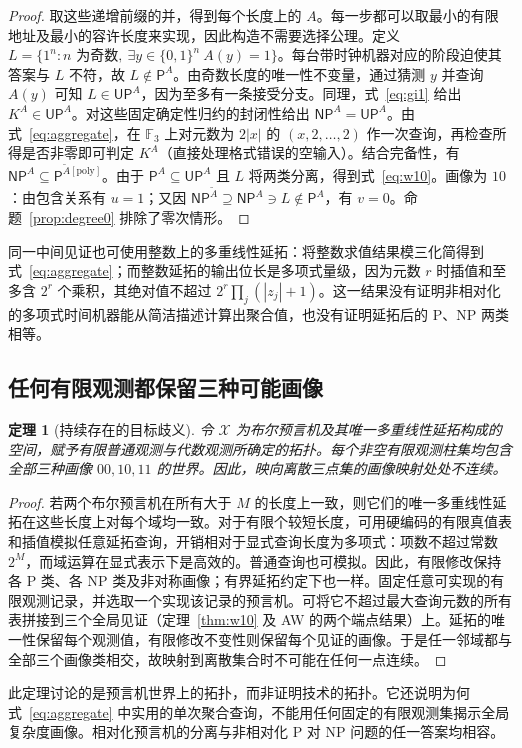 \documentclass[11pt,a4paper]{article}
\newcommand{\bits}{\{0,1\}}
\newcommand{\PP}{\mathsf{P}}
\newcommand{\NP}{\mathsf{NP}}
\newcommand{\UP}{\mathsf{UP}}
\newcommand{\Atil}{\widetilde A}
\newcommand{\F}{\mathbb F}
\newtheorem{theorem}{定理}[section]
\begin{document}
\begin{proof}
取这些递增前缀的并，得到每个长度上的 $A$。每一步都可以取最小的有限地址及最小的容许长度来实现，因此构造不需要选择公理。定义 $L=\{1^n:n\text{ 为奇数},\ \exists y\in\bits^n\ A(y)=1\}$。每台带时钟机器对应的阶段迫使其答案与 $L$ 不符，故 $L\notin\PP^A$。由奇数长度的唯一性不变量，通过猜测 $y$ 并查询 $A(y)$ 可知 $L\in\UP^A$，因为至多有一条接受分支。同理，式~\eqref{eq:gi1} 给出 $K^A\in\UP^A$。对这些固定确定性归约的封闭性给出 $\NP^A=\UP^A$。由式~\eqref{eq:aggregate}，在 $\F_3$ 上对元数为 $2|x|$ 的 $(x,2,\ldots,2)$ 作一次查询，再检查所得是否非零即可判定 $K^A$（直接处理格式错误的空输入）。结合完备性，有 $\NP^A\subseteq\PP^{\Atil[\mathrm{poly}]}$。由于 $\PP^A\subseteq\UP^A$ 且 $L$ 将两类分离，得到式~\eqref{eq:w10}。画像为 $10$：由包含关系有 $u=1$；又因 $\NP^{\Atil}\supseteq\NP^A\ni L\notin\PP^A$，有 $v=0$。命题~\ref{prop:degree0} 排除了零次情形。
\end{proof}
同一中间见证也可使用整数上的多重线性延拓：将整数求值结果模三化简得到式~\eqref{eq:aggregate}；而整数延拓的输出位长是多项式量级，因为元数 $r$ 时插值和至多含 $2^r$ 个乘积，其绝对值不超过 $2^r\prod_j(|z_j|+1)$。这一结果没有证明非相对化的多项式时间机器能从简洁描述计算出聚合值，也没有证明延拓后的 P、NP 两类相等。

\subsection{任何有限观测都保留三种可能画像}
\begin{theorem}[持续存在的目标歧义]\label{thm:top}
令 $\mathcal X$ 为布尔预言机及其唯一多重线性延拓构成的空间，赋予有限普通观测与代数观测所确定的拓扑。每个非空有限观测柱集均包含全部三种画像 $00,10,11$ 的世界。因此，映向离散三点集的画像映射处处不连续。
\end{theorem}
\begin{proof}
若两个布尔预言机在所有大于 $M$ 的长度上一致，则它们的唯一多重线性延拓在这些长度上对每个域均一致。对于有限个较短长度，可用硬编码的有限真值表和插值模拟任意延拓查询，开销相对于显式查询长度为多项式：项数不超过常数 $2^M$，而域运算在显式表示下是高效的。普通查询也可模拟。因此，有限修改保持各 P 类、各 NP 类及非对称画像；有界延拓约定下也一样。固定任意可实现的有限观测记录，并选取一个实现该记录的预言机。可将它不超过最大查询元数的所有表拼接到三个全局见证（定理~\ref{thm:w10} 及 AW 的两个端点结果）上。延拓的唯一性保留每个观测值，有限修改不变性则保留每个见证的画像。于是任一邻域都与全部三个画像类相交，故映射到离散集合时不可能在任何一点连续。
\end{proof}
此定理讨论的是预言机世界上的拓扑，而非证明技术的拓扑。它还说明为何式~\eqref{eq:aggregate} 中实用的单次聚合查询，不能用任何固定的有限观测集揭示全局复杂度画像。相对化预言机的分离与非相对化 P 对 NP 问题的任一答案均相容。
\end{document}
